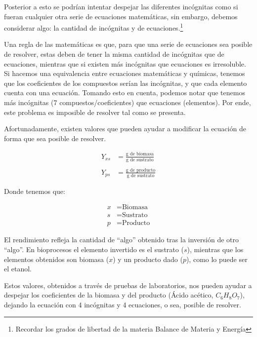 Posterior a esto se podrían intentar despejar las diferentes incógnitas como si fueran cualquier otra serie de ecuaciones matemáticas, sin embargo, debemos considerar algo: la cantidad de incógnitas y de ecuaciones.\footnote{Recordar los grados de libertad de la materia Balance de Materia y Energía}

Una regla de las matemáticas es que, para que una serie de ecuaciones sea posible de resolver, estas deben de tener la misma cantidad de incógnitas que de ecuaciones, mientras que si existen más incógnitas que ecuaciones es irresoluble. Si hacemos una equivalencia entre ecuaciones matemáticas y químicas, tenemos que los coeficientes de los compuestos serían las incógnitas, y que cada elemento cuenta con una ecuación. Tomando esto en cuenta, podemos notar que tenemos más incógnitas (7 compuestos/coeficientes) que ecuaciones (elementos). Por ende, este problema es imposible de resolver tal como se presenta.

Afortunadamente, existen valores que pueden ayudar a modificar la ecuación de forma que sea posible de resolver.

\begin{align*}
    Y_{xs} &= \frac{\text{g de biomasa}}{\text{g de sustrato}}
    \\
    \\
    Y_{ps} &= \frac{\text{g de producto}}{\text{g de sustrato}}
\end{align*}

Donde tenemos que: 

\begin{align*}
    x &= \text{Biomasa}
    \\
    s &= \text{Sustrato}
    \\
    p &= \text{Producto}
\end{align*}

El rendimiento refleja la cantidad de ``algo'' obtenido tras la inversión de otro ``algo''. En bioprocesos el elemento invertido es el sustrato ($s$), mientras que los elementos obtenidos son biomasa ($x$) y un producto dado ($p$), como lo  puede ser el etanol.

Estos valores, obtenidos a través de pruebas de laboratorios, nos pueden ayudar a despejar los coeficientes de la biomasa y del producto (Ácido acético, $C_{6}H_{8}O_{7}$), dejando la ecuación con 4 incógnitas y 4 ecuaciones, o sea, posible de resolver.

